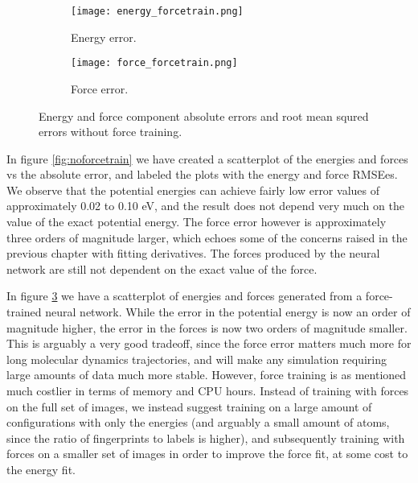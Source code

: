 \begin{figure}[H]
\begin{adjustbox}{max width=1.2\linewidth,center}
\centering
  \begin{subfigure}[b]{0.55\textwidth}
      \texttt{[image: energy\_forcetrain.png]}
      \caption{Energy error.}
    \label{fig:f1}
  \end{subfigure}
  \hfill
  \begin{subfigure}[b]{0.55\textwidth}
      \texttt{[image: force\_forcetrain.png]}
      \caption{Force error.}
    \label{fig:f2}
  \end{subfigure}
\end{adjustbox}
\caption{Energy and force component absolute errors and root mean squred
    errors without force training.}
    \label{fig:forcetrain}
\end{figure}

In figure \ref{fig:noforcetrain} we have created a scatterplot
of the energies and forces vs the absolute error, and labeled
the plots with the energy and force RMSEes.
We observe that the potential energies can achieve fairly
low error values of approximately 0.02 to 0.10 eV, and the
result does not depend very much on the value of the exact potential
energy.
The force error however is approximately three orders of magnitude
larger, which echoes some of the concerns raised in the previous
chapter with fitting derivatives. The forces produced by the neural
network are still not dependent on the exact value of the force.
\par
In figure \ref{fig:forcetrain} we have a scatterplot of energies
and forces generated from a force-trained neural network.
While the error in the potential energy is now an order of magnitude higher,
the error in the forces is now two orders of magnitude smaller.
This is arguably a very good tradeoff, since the force error matters
much more for long molecular dynamics trajectories, and will make
any simulation requiring large amounts of data much more stable.
However, force training is as mentioned much costlier in terms
of memory and CPU hours. Instead of training with forces on the full
set of images, we instead suggest training on a large amount of configurations
with only the energies (and arguably a small amount of atoms, since
the ratio of fingerprints to labels is higher), and subsequently training
with forces on a smaller set of images in order to improve the force fit,
at some cost to the energy fit.

